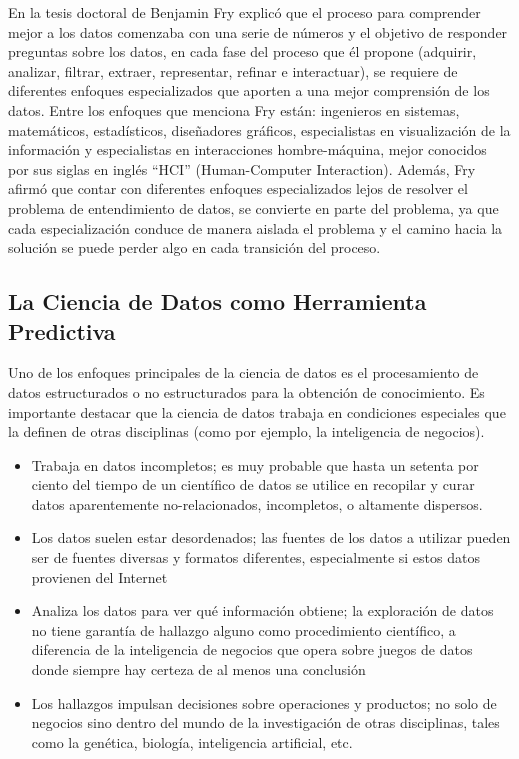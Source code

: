 En la tesis doctoral de Benjamin Fry \cite{fry} explicó que el proceso para comprender mejor a los datos comenzaba con una serie de números y el objetivo de responder preguntas sobre los datos, en cada fase del proceso que él propone (adquirir, analizar, filtrar, extraer, representar, refinar e interactuar), se requiere de diferentes enfoques especializados que aporten a una mejor comprensión de los datos. Entre los enfoques que menciona Fry están: ingenieros en sistemas, matemáticos, estadísticos, diseñadores gráficos, especialistas en visualización de la información y especialistas en interacciones hombre-máquina, mejor conocidos por sus siglas en inglés “HCI” (Human-Computer Interaction). Además, Fry afirmó que contar con diferentes enfoques especializados lejos de resolver el problema de entendimiento de datos, se convierte en parte del problema, ya que cada especialización conduce de manera aislada el problema y el camino hacia la solución se puede perder algo en cada transición del proceso.

\subsection{La Ciencia de Datos como Herramienta Predictiva}
Uno de los enfoques principales de la ciencia de datos es el procesamiento de datos estructurados o no estructurados para la obtención de conocimiento. Es importante destacar que la ciencia de datos trabaja en condiciones especiales que la definen de otras disciplinas (como por ejemplo, la inteligencia de negocios). 

\begin{itemize}
	\item Trabaja en datos incompletos; es muy probable que hasta un setenta por ciento del tiempo de un científico de datos se utilice en recopilar y curar datos aparentemente no-relacionados, incompletos, o altamente dispersos. 
	\item Los datos suelen estar desordenados; las fuentes de los datos a utilizar pueden ser de fuentes diversas y formatos diferentes, especialmente si estos datos provienen del Internet
	\item Analiza los datos para ver qué información obtiene; la exploración de datos no tiene garantía de hallazgo alguno como procedimiento científico, a diferencia de la inteligencia de negocios que opera sobre juegos de datos donde siempre hay certeza de al menos una conclusión 
	\item Los hallazgos impulsan decisiones sobre operaciones y productos; no solo de negocios sino dentro del mundo de la investigación de otras disciplinas, tales como la genética, biología, inteligencia artificial, etc.
\end{itemize}

